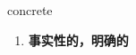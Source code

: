 
\begin{frame}
{\huge concrete}
\begin{center}
\begin{enumerate}\Large
  \item \textbf{事实性的，明确的}
\end{enumerate}
\end{center}
\end{frame}
